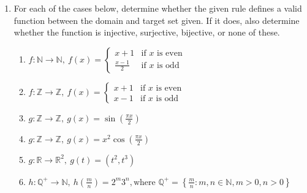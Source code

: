 \documentclass[12pt]{article}
\begin{document}
\begin{enumerate}
    \item For each of the cases below, determine whether the given rule defines a valid function between the domain and target set given. 
    If it does, also determine whether the function is injective, surjective, bijective, or none of these.
    \begin{enumerate}
        \item $f : \mathbb{N} \to \mathbb{N}, \ f(x) = \begin{cases} 
            x + 1 & \text{if } x \text{ is even} \\ 
            \frac{x - 1}{2} & \text{if } x \text{ is odd}
        \end{cases}$
        \item $f : \mathbb{Z} \to \mathbb{Z}, \ f(x) = \begin{cases} 
            x + 1 & \text{if } x \text{ is even} \\ 
            x - 1 & \text{if } x \text{ is odd}
        \end{cases}$
        \item $g : \mathbb{Z} \to \mathbb{Z}, \ g(x) = \sin\left(\frac{\pi x}{2}\right)$
        \item $g : \mathbb{Z} \to \mathbb{Z}, \ g(x) = x^2 \cos\left(\frac{\pi x}{2}\right)$
        \item $g : \mathbb{R} \to \mathbb{R}^2, \ g(t) = (t^2, t^3)$
        \item $h : \mathbb{Q}^+ \to \mathbb{N}, \ h\left(\frac{m}{n}\right) = 2^m 3^n, \text{where } \mathbb{Q}^+ = \left\{\frac{m}{n} : m, n \in \mathbb{N}, m > 0, n > 0\right\}$
    \end{enumerate}
\end{enumerate}
\end{document}
